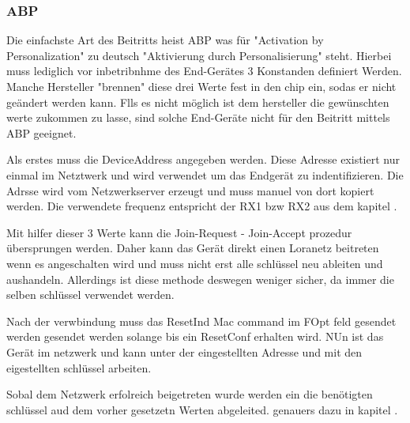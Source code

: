 \documentclass[a4paper,12pt]{article}
\begin{document}
            \subsubsection{ABP}
                Die einfachste Art des Beitritts heist ABP was für "Activation by Personalization" zu deutsch "Aktivierung durch Personalisierung" steht. Hierbei muss lediglich vor inbetribnhme des End-Gerätes 3 Konstanden definiert Werden. Manche Hersteller "brennen" diese 
                drei Werte fest in den chip ein, sodas er nicht geändert werden kann. Flls es nicht möglich ist dem hersteller die gewünschten werte zukommen zu lasse, sind solche End-Geräte nicht für den Beitritt mittels ABP geeignet.
                
                Als erstes muss die DeviceAddress angegeben werden. Diese Adresse existiert nur einmal im Netztwerk und wird verwendet um das Endgerät zu indentifizieren. Die Adrsse wird vom Netzwerkserver erzeugt und muss manuel von dort kopiert werden.  Die verwendete frequenz entspricht der RX1 bzw RX2 aus dem kapitel .

                Mit hilfer dieser 3 Werte kann die Join-Request - Join-Accept prozedur übersprungen werden. Daher kann das Gerät direkt einen Loranetz beitreten wenn es angeschalten wird und muss nicht erst alle schlüssel neu ableiten und aushandeln. Allerdings ist diese methode deswegen weniger sicher, da immer die selben schlüssel verwendet werden.

                Nach der verwbindung muss das ResetInd Mac command im FOpt feld gesendet werden gesendet werden solange bis ein ResetConf erhalten wird. NUn ist das Gerät im netzwerk und kann unter der eingestellten Adresse und mit den eigestellten schlüssel arbeiten.
           
                Sobal dem Netzwerk erfolreich beigetreten wurde werden ein die benötigten schlüssel aud dem vorher gesetzetn Werten abgeleited. genauers dazu in kapitel .
\end{document}
